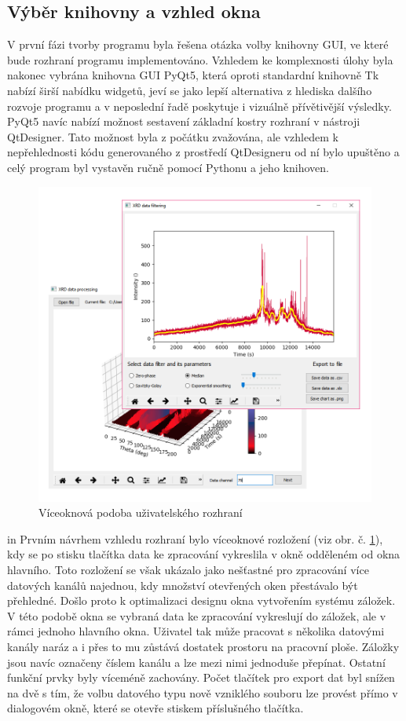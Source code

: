 \documentclass[a4paper, 12pt]{article}
\begin{document}
\subsection{Výběr knihovny a vzhled okna}
V první fázi tvorby programu byla řešena otázka volby knihovny GUI, ve které bude rozhraní programu implementováno. Vzhledem ke komplexnosti úlohy byla nakonec vybrána knihovna GUI PyQt5, která oproti standardní knihovně Tk nabízí širší nabídku widgetů, jeví se jako lepší alternativa z hlediska dalšího rozvoje programu a v neposlední řadě poskytuje i vizuálně přívětivější výsledky.
PyQt5 navíc nabízí možnost sestavení základní kostry rozhraní v nástroji QtDesigner. Tato možnost byla z počátku zvažována, ale vzhledem k nepřehlednosti kódu generovaného z prostředí QtDesigneru od ní bylo upuštěno a celý program byl vystavěn ručně pomocí Pythonu a jeho knihoven.
\begin{figure}[h!]
 \centering
 \includegraphics[width=0.85\linewidth]{oldwin.png}
 \caption{Víceoknová podoba uživatelského rozhraní}
 \label{fig:oldwin}
\end{figure}
 in
\noindent Prvním návrhem vzhledu rozhraní bylo víceoknové rozložení (viz obr. č. \ref{fig:oldwin}), kdy se po stisku tlačítka  data ke zpracování vykreslila v okně odděleném od okna hlavního. Toto rozložení se však ukázalo jako nešťastné pro zpracování více datových kanálů najednou, kdy množství otevřených oken přestávalo být přehledné. Došlo proto k optimalizaci designu okna vytvořením systému záložek. V této podobě okna se vybraná data ke zpracování vykreslují do záložek, ale v rámci jednoho hlavního okna. Uživatel tak může pracovat s několika datovými kanály naráz a i přes to mu zůstává dostatek prostoru na pracovní ploše. Záložky jsou navíc označeny číslem kanálu a lze mezi nimi jednoduše přepínat. Ostatní funkční prvky byly víceméně zachovány. Počet tlačítek pro export dat byl snížen na dvě s tím, že volbu datového typu nově vzniklého souboru lze provést přímo v dialogovém okně, které se otevře stiskem příslušného tlačítka.
\end{document}
